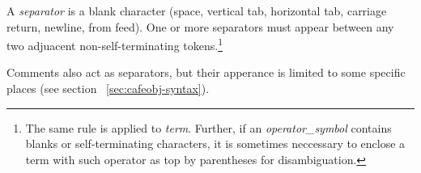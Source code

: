 \documentclass[a4paper]{article}
\def\nonterm#1{\textit{#1}\null}
\begin{document}
A \nonterm{separator} is a blank character (space, vertical tab,
horizontal tab, carriage return, newline, from feed).
One or more separators must appear between any two adjuacent
non-self-terminating tokens.\footnote{The same rule is applied to 
  \nonterm{term}.
  Further, if an \nonterm{operator\_symbol} contains blanks or
  self-terminating characters, it is sometimes neccessary to enclose a
  term with such operator as top by parentheses for disambiguation.}

Comments also act as separators, but their apperance is limited to
some specific places (see section ~\ref{sec:cafeobj-syntax}).
\end{document}
